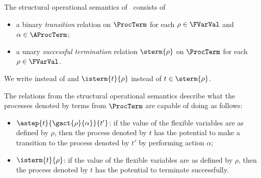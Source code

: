 \documentclass[runningheads]{llncs}
\begin{document}
\pagebreak[2]
The structural operational semantics of \deACPei\ consists of 
\nopagebreak[2]
\begin{itemize}
\item 
a binary \emph{transition} relation 
\smash{$\step{\gact{\rho}{\alpha}}$} on $\ProcTerm$ for each 
$\rho \in \FVarVal$ and $\alpha \in \AProcTerm$;
\item 
a unary \emph{successful termination} relation $\sterm{\rho}$ on 
$\ProcTerm$ for each $\rho \in \FVarVal$.
\end{itemize}
We write  instead of 
 and 
$\isterm{t}{\rho}$ instead of $t \in {\sterm{\rho}}$.

The relations from the structural operational semantics describe what 
the processes denoted by terms from $\ProcTerm$ are capable of doing as 
follows:
\begin{itemize}
\item
$\astep{t}{\gact{\rho}{\alpha}}{t'}$: 
if the value of the flexible variables are as defined by $\rho$, then 
the process denoted by $t$ has the potential to make a transition to the 
process denoted by $t'$ by performing action $\alpha$;
\item
$\isterm{t}{\rho}$: 
if the value of the flexible variables are as defined by $\rho$, then 
the process denoted by $t$ has the potential to terminate successfully.
\end{itemize}
\end{document}
